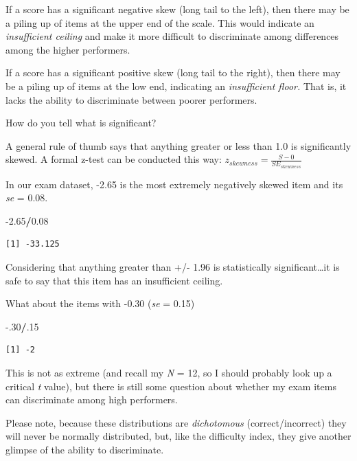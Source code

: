 \documentclass[
  english,
]{book}
\newenvironment{Shaded}{\begin{snugshade}}{\end{snugshade}}
\newcommand{\DecValTok}[1]{\textcolor[rgb]{0.00,0.00,0.81}{#1}}
\newcommand{\FloatTok}[1]{\textcolor[rgb]{0.00,0.00,0.81}{#1}}
\newcommand{\NormalTok}[1]{#1}
\newcommand{\OperatorTok}[1]{\textcolor[rgb]{0.81,0.36,0.00}{\textbf{#1}}}
\begin{document}
If a score has a significant negative skew (long tail to the left), then there may be a piling up of items at the upper end of the scale. This would indicate an \emph{insufficient ceiling} and make it more difficult to discriminate among differences among the higher performers.

If a score has a significant positive skew (long tail to the right), then there may be a piling up of items at the low end, indicating an \emph{insufficient floor.} That is, it lacks the ability to discriminate between poorer performers.

How do you tell what is significant?

A general rule of thumb says that anything greater or less than 1.0 is significantly skewed. A formal z-test can be conducted this way: \(z_{skewness}= \frac{S-0}{SE_{skewness}}\)

In our exam dataset, -2.65 is the most extremely negatively skewed item and its \emph{se} = 0.08.

\begin{Shaded}
\begin{Highlighting}[]
\FloatTok{-2.65}\OperatorTok{/}\FloatTok{0.08}
\end{Highlighting}
\end{Shaded}

\begin{verbatim}
[1] -33.125
\end{verbatim}

Considering that anything greater than +/- 1.96 is statistically significant\ldots it is safe to say that this item has an insufficient ceiling.

What about the items with -0.30 (\emph{se} = 0.15)

\begin{Shaded}
\begin{Highlighting}[]
\FloatTok{-.30}\OperatorTok{/}\NormalTok{.}\DecValTok{15}
\end{Highlighting}
\end{Shaded}

\begin{verbatim}
[1] -2
\end{verbatim}

This is not as extreme (and recall my \emph{N} = 12, so I should probably look up a critical \emph{t} value), but there is still some question about whether my exam items can discriminate among high performers.

Please note, because these distributions are \emph{dichotomous} (correct/incorrect) they will never be normally distributed, but, like the difficulty index, they give another glimpse of the ability to discriminate.
\end{document}
